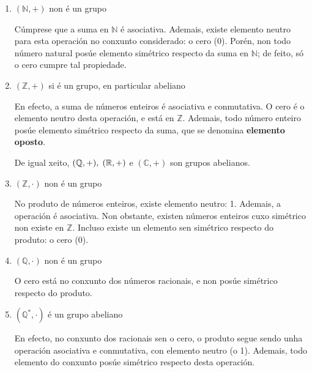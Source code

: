 \documentclass[twoside]{report}
\theoremstyle{mystyle}
\begin{document}
\begin{enumerate}
    \item $(\mathbb{N}, +)$ non é un grupo
    
    \vspace{1mm}
    
    Cúmprese que a suma en $\mathbb{N}$ é asociativa. Ademais, existe elemento neutro para esta operación no conxunto considerado: o cero (0). Porén, non todo número natural posúe elemento simétrico respecto da suma en $\mathbb{N}$; de feito, só o cero cumpre tal propiedade.
    
    \item $(\mathbb{Z}, +)$ si é un grupo, en particular abeliano
    
    \vspace{1mm}
    
    En efecto, a suma de números enteiros é asociativa e conmutativa. O cero é o elemento neutro desta operación, e está en $\mathbb{Z}$. Ademais, todo número enteiro posúe elemento simétrico respecto da suma, que se denomina \textbf{elemento oposto}.
    
    De igual xeito, $(\mathbb{Q},+), \hspace{1mm} (\mathbb{R},+)$ e $(\mathbb{C},+)$ son grupos abelianos.
    
    \item $(\mathbb{Z}, \cdot)$ non é un grupo
    
    \vspace{1mm}
    
    No produto de números enteiros, existe elemento neutro: 1. Ademais, a operación é asociativa. Non obstante, existen números enteiros cuxo simétrico non existe en $\mathbb{Z}$. Incluso existe un elemento sen simétrico respecto do produto: o cero (0).
    
    \item $(\mathbb{Q}, \cdot)$ non é un grupo
    
    \vspace{1mm}
    
    O cero está no conxunto dos números racionais, e non posúe simétrico respecto do produto.
    
    \item $(\mathbb{Q}^{*}, \cdot)$ é un grupo abeliano
    
    \vspace{1mm}
    
    En efecto, no conxunto dos racionais sen o cero, o produto segue sendo unha operación asociativa e conmutativa, con elemento neutro (o 1). Ademais, todo elemento do conxunto posúe simétrico respecto desta operación.
    

\end{enumerate}
\end{document}
